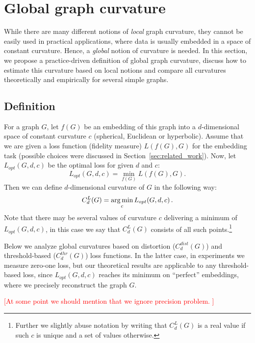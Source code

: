 \documentclass{article} %
\begin{document}
\section{Global graph curvature}

While there are many different notions of \textit{local} graph curvature, they cannot be easily used in practical applications, where data is usually embedded in a space of constant curvature. 
Hence, a \textit{global} notion of curvature is needed. 
In this section, we propose a practice-driven definition of global graph curvature, discuss how to estimate this curvature based on local notions and compare all curvatures theoretically and empirically for several simple graphs.

\subsection{Definition}\label{sec:global_curvature_definition}

For a graph $G$, let $f(G)$ be an embedding of this graph into a $d$-dimensional space of constant curvature $c$ (spherical, Euclidean or hyperbolic). 
Assume that we are given a loss function (fidelity measure) $L(f(G),G)$ for the embedding task (possible choices were discussed in Section~\ref{sec:related_work}).
Now, let $L_{opt}(G,d,c)$ be the optimal loss for given $d$ and $c$:
\[
L_{opt}(G,d,c) = \min_{f(G)} L(f(G),G).
\]
Then we can define $d$-dimensional curvature of $G$ in the following way:
\begin{equation}\label{eq:global_curvature}
C_{d}^{L}(G) = \operatorname*{arg\,min}_c L_{opt}(G,d,c)\,.
\end{equation}
Note that there may be several values of curvature $c$ delivering a minimum of $L_{opt}(G,d,c)$, in this case we say that  $C_{d}^{L}(G)$ consists of all such points.\footnote{Further we slightly abuse notation by writing that $C_{d}^{L}(G)$ is a real value if such $c$ is unique and a set of values otherwise.}

Below we analyze global curvatures based on distortion ($C_d^{dist}(G)$) and threshold-based ($C_d^{thr}(G)$) loss functions. 
In the latter case, in experiments we measure zero-one loss, but our theoretical results are applicable to any threshold-based loss, since 
$L_{opt}(G,d,c)$ reaches its minimum on ``perfect'' embeddings, where we precisely reconstruct the graph $G$.

\textcolor{red}{[At some point we should mention that we ignore precision problem. ]}
\end{document}
